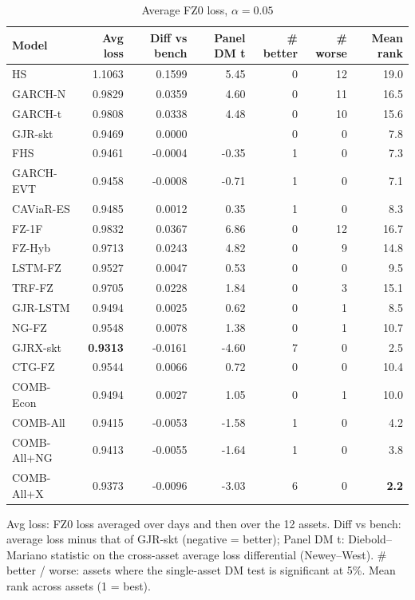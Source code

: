 \begin{table}[htbp]
\centering
\footnotesize
\caption{Average FZ0 loss, $\alpha=0.05$}
\label{tab:loss_a050}
\begin{tabular}{lrrrrrr}
\toprule
Model & Avg loss & Diff vs bench & Panel DM t & \# better & \# worse & Mean rank \\
\midrule
HS & 1.1063 & 0.1599 & 5.45 & 0 & 12 & 19.0 \\
GARCH-N & 0.9829 & 0.0359 & 4.60 & 0 & 11 & 16.5 \\
GARCH-t & 0.9808 & 0.0338 & 4.48 & 0 & 10 & 15.6 \\
GJR-skt & 0.9469 & 0.0000 &  & 0 & 0 & 7.8 \\
FHS & 0.9461 & -0.0004 & -0.35 & 1 & 0 & 7.3 \\
GARCH-EVT & 0.9458 & -0.0008 & -0.71 & 1 & 0 & 7.1 \\
CAViaR-ES & 0.9485 & 0.0012 & 0.35 & 1 & 0 & 8.3 \\
FZ-1F & 0.9832 & 0.0367 & 6.86 & 0 & 12 & 16.7 \\
FZ-Hyb & 0.9713 & 0.0243 & 4.82 & 0 & 9 & 14.8 \\
LSTM-FZ & 0.9527 & 0.0047 & 0.53 & 0 & 0 & 9.5 \\
TRF-FZ & 0.9705 & 0.0228 & 1.84 & 0 & 3 & 15.1 \\
GJR-LSTM & 0.9494 & 0.0025 & 0.62 & 0 & 1 & 8.5 \\
NG-FZ & 0.9548 & 0.0078 & 1.38 & 0 & 1 & 10.7 \\
GJRX-skt & \textbf{0.9313} & -0.0161 & -4.60 & 7 & 0 & 2.5 \\
CTG-FZ & 0.9544 & 0.0066 & 0.72 & 0 & 0 & 10.4 \\
COMB-Econ & 0.9494 & 0.0027 & 1.05 & 0 & 1 & 10.0 \\
COMB-All & 0.9415 & -0.0053 & -1.58 & 1 & 0 & 4.2 \\
COMB-All+NG & 0.9413 & -0.0055 & -1.64 & 1 & 0 & 3.8 \\
COMB-All+X & 0.9373 & -0.0096 & -3.03 & 6 & 0 & \textbf{2.2} \\
\bottomrule
\end{tabular}
\par\smallskip\parbox{\linewidth}{\scriptsize Avg loss: FZ0 loss averaged over days and then over the 12 assets. Diff vs bench: average loss minus that of GJR-skt (negative = better); Panel DM t: Diebold--Mariano statistic on the cross-asset average loss differential (Newey--West). \# better / worse: assets where the single-asset DM test is significant at 5\%. Mean rank across assets (1 = best).}
\end{table}